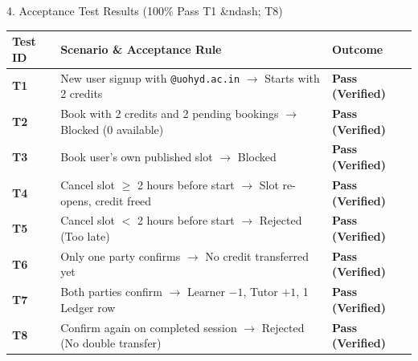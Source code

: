 \documentclass[aspectratio=169,10pt]{beamer}
\begin{document}
\begin{frame}{4. Acceptance Test Results (100\% Pass T1 &ndash; T8)}
  \begin{table}
    \centering
    \footnotesize
    \begin{tabular}{lll}
      \toprule
      \textbf{Test ID} & \textbf{Scenario \& Acceptance Rule} & \textbf{Outcome} \\
      \midrule
      \textbf{T1} & New user signup with \texttt{@uohyd.ac.in} $\rightarrow$ Starts with 2 credits & \textbf{Pass (Verified)} \\
      \textbf{T2} & Book with 2 credits and 2 pending bookings $\rightarrow$ Blocked (0 available) & \textbf{Pass (Verified)} \\
      \textbf{T3} & Book user's own published slot $\rightarrow$ Blocked & \textbf{Pass (Verified)} \\
      \textbf{T4} & Cancel slot $\ge$ 2 hours before start $\rightarrow$ Slot re-opens, credit freed & \textbf{Pass (Verified)} \\
      \textbf{T5} & Cancel slot $<$ 2 hours before start $\rightarrow$ Rejected (Too late) & \textbf{Pass (Verified)} \\
      \textbf{T6} & Only one party confirms $\rightarrow$ No credit transferred yet & \textbf{Pass (Verified)} \\
      \textbf{T7} & Both parties confirm $\rightarrow$ Learner $-1$, Tutor $+1$, 1 Ledger row & \textbf{Pass (Verified)} \\
      \textbf{T8} & Confirm again on completed session $\rightarrow$ Rejected (No double transfer) & \textbf{Pass (Verified)} \\
      \bottomrule
    \end{tabular}
  \end{table}
\end{frame}
\end{document}
